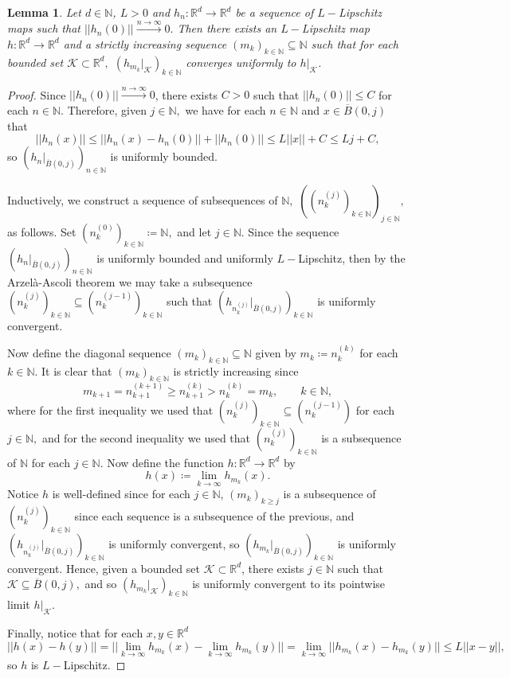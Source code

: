 \documentclass{article}
\newtheorem{lemma}[define]{Lemma}
\newcommand{\R}{\mathbb{R}}
\newcommand{\N}{\mathbb{N}}
\begin{document}
\begin{lemma} \label{lemma: lip extension on Rd}
    Let $d \in \N$, $L>0$ and $h_n:\R^d\to \R^d$ be a sequence of $L-$Lipschitz maps such that $||h_n(0)|| \xrightarrow{n \to \infty} 0.$ Then there exists an $L-$Lipschitz map $h:\R^d \to \R^d$ and a strictly increasing sequence $(m_k)_{k \in \N} \subseteq \N$ such that for each bounded set $\mathcal{K} \subset \R^d,$ $(h_{m_k}|_\mathcal{K})_{k \in \N}$ converges uniformly to $h|_\mathcal{K}$.
\end{lemma}
\begin{proof}
Since $||h_n(0)|| \xrightarrow{n \to \infty} 0$, there exists $C>0$ such that $||h_n(0)|| \leq C$ for each $n \in \N.$ Therefore, given $j \in \N,$ we have for each $n \in \N$ and $x \in \overline{B}(0,j)$ that
    $$||h_n(x)|| \leq ||h_n(x)-h_n(0)||+||h_n(0)||\leq L||x||+C\leq Lj+C,$$ so $(h_n|_{\overline{B}(0,j)})_{n \in \N}$ is uniformly bounded. 

Inductively, we construct a sequence of subsequences of $\N,$ $((n_k^{(j)})_{k \in \N})_{j \in \N},$ as follows. Set $(n_k^{(0)})_{k \in \N} \coloneqq \N,$ and let $j \in \N.$
Since the sequence $(h_n|_{\overline{B}(0,j)})_{n \in \N}$ is uniformly bounded and uniformly $L-$Lipschitz, then by the Arzelà-Ascoli theorem we may take a subsequence $(n_k^{(j)})_{k \in \N} \subseteq (n_k^{(j-1)})_{k \in \N}$ such that $(h_{n_k^{(j)}}|_{\overline{B}(0,j)})_{k \in \N}$ is uniformly convergent. 

Now define the diagonal sequence $(m_k)_{k \in \N}\subseteq \N$ given by $m_k \coloneqq n_k^{(k)}$ for each $k \in \N.$ It is clear that $(m_k)_{k \in \N}$ is strictly increasing since 
$$m_{k+1} =n^{(k+1)}_{k+1} \geq n_{k+1}^{(k)}>n_{k}^{(k)}=m_k, \qquad k \in \N,$$ where for the first inequality we used that $(n_k^{(j)})_{k \in \N} \subseteq (n_k^{(j-1)})$ for each $j \in \N,$ and for the second inequality we used that $(n_k^{(j)})_{k \in \N}$ is a subsequence of $\N$ for each $j \in \N.$ Now define the function $h:\R^d \to \R^d$ by
$$h(x) \coloneqq \lim_{k \to \infty} h_{m_k}(x).$$ 
Notice $h$ is well-defined since for each $j \in \N$, $(m_k)_{k \geq j}$ is a subsequence of $(n_k^{(j)})_{k \in \N}$ since each sequence is a subsequence of the previous, and $(h_{n_k^{(j)}}|_{\overline{B}(0,j)})_{k \in \N}$ is uniformly convergent, so $(h_{m_k}|_{\overline{B}(0,j)})_{k \in \N}$ is uniformly convergent. Hence, given a bounded set $\mathcal{K} \subset \R^d$, there exists $j \in \N$ such that $\mathcal{K} \subseteq \overline{B}(0,j),$ and so $(h_{m_k}|_\mathcal{K})_{k \in \N}$ is uniformly convergent to its pointwise limit $h|_\mathcal{K}.$

Finally, notice that for each $x,y \in \R^d$
$$||h(x)-h(y)|| = \bigg|\bigg|\lim_{k \to \infty} h_{m_k}(x) - \lim_{k \to \infty}h_{m_k}(y)\bigg|\bigg| = \lim_{k \to \infty}||h_{m_k}(x)-h_{m_k}(y)|| \leq  L||x-y||,$$ so $h$ is $L-$Lipschitz. 
\end{proof}
\end{document}
